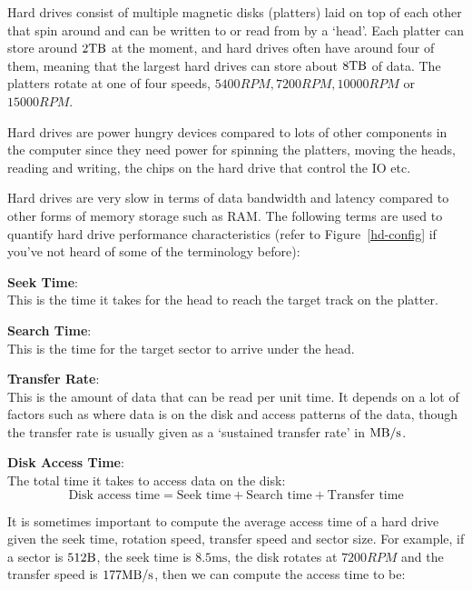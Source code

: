 Hard drives consist of multiple magnetic disks (platters) laid on top of each
other that spin around and can be written to or read from by a `head'. Each
platter can store around $2\si{\tera\byte}$ at the moment, and hard drives often
have around four of them, meaning that the largest hard drives can store about
$8\si{\tera\byte}$ of data. The platters rotate at one of four speeds, $5400RPM,
7200RPM, 10000RPM$ or $15000RPM$.

Hard drives are power hungry devices compared to lots of other components in the
computer since they need power for spinning the platters, moving the heads,
reading and writing, the chips on the hard drive that control the IO etc.

Hard drives are very slow in terms of data bandwidth and latency compared to
other forms of memory storage such as RAM. The following terms are used to
quantify hard drive performance characteristics (refer to Figure~\ref{hd-config}
if you've not heard of some of the terminology before):

\begin{description}
  \item \textbf{Seek Time}:\\
    This is the time it takes for the head to reach the target track on the
    platter.
  \item \textbf{Search Time}:\\
    This is the time for the target sector to arrive under the head.
  \item \textbf{Transfer Rate}:\\
    This is the amount of data that can be read per unit time. It depends on
    a lot of factors such as where data is on the disk and access patterns of
    the data, though the transfer rate is usually given as a `sustained transfer
    rate' in $\si{\mega\byte\per\second}$.
  \item \textbf{Disk Access Time}:\\
    The total time it takes to access data on the disk:
    \[
     \text{Disk access time} = \text{Seek time} + \text{Search time}
                                + \text{Transfer time}
    \]
\end{description}

It is sometimes important to compute the average access time of a hard drive
given the seek time, rotation speed, transfer speed and sector size. For
example, if a sector is $512\si{\byte}$, the seek time is
$8.5\si{\milli\second}$, the disk rotates at $7200RPM$ and the transfer speed is
$177\si{\mega\byte\per\second}$, then we can compute the access time to be:


